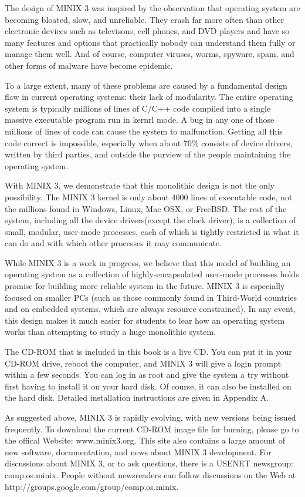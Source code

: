 \documentclass{book}
\begin{document}
The design of MINIX 3 was inspired by the observation that operating system are becoming bloated, slow, and unreliable. 
They crash far more often than other electronic devices such as televisons, cell phones, and DVD players 
and have so many features and options that practically nobody can understand them fully or manage them well.
And of course, computer viruses, worms, spyware, spam, and other forms of malware have become epidemic.

To a large extent, many of these problems are caused by a fundamental design flaw in current operating systems: their lack of modularity. 
The entire operating system is typically millions of lines of C/C++ code compiled into a single massive executable program run in kernrl mode.
A bug in any one of those millions of lines of code can cause the system to malfunction.
Getting all this code correct is impossible, especially when about 70\% consists of device drivers, written by third parties, 
and outside the purview of the people maintaining the operating system.

With MINIX 3, we demonstrate that this monolithic design is not the only possibility. 
The MINIX 3 kernel is only about 4000 lines of executable code, not the millions found in Windows, Linux, Mac OSX, or FreeBSD.
The rest of the system, including all the device drivers(except the clock driver), is a collection of small, modular, user-mode processes, 
each of which is tightly restricted in what it can do and with which other processes it may communicate.

While MINIX 3 is a work in progress, we believe that this model of building an operating system as a collection of highly-encapsulated user-mode 
processes holds promise for building more reliable system in the future.
MINIX 3 is especially focused on smaller PCs
(such as those commonly found in Third-World countries and on embedded systems, which are always resource constrained).
In any event, this design makes it much easier for students to lear how an operating system works than attempting to study a huge monolithic system.

The CD-ROM that is included in this book is a live CD. 
You can put it in your CD-ROM drive, reboot the computer, and MINIX 3 will give a login prompt within a few seconds. 
You can log in as root and give the system a try without first having to install it on your hard disk.
Of course, it can also be installed on the hard disk.
Detailed installation instructions are given in Appendix A.

As suggested above, MINIX 3 is rapidly evolving, with new versions being issued frequently.
To download the current CD-ROM image file for burning, please go to the offical Website: www.minix3.org.
This site also contains a large amount of new software, documentation, and news about MINIX 3 development.
For discussions about MINIX 3, or to ask questions, there is a USENET newsgroup: comp.os.minix.
People without newsreaders can follow discussions on the Web at http://groups.google.com/group/comp.os.minix.
\end{document}

